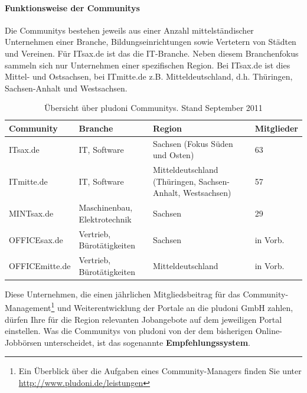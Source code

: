 \paragraph{Funktionsweise der Communitys}
Die Communitys bestehen jeweils aus einer Anzahl mittelständischer Unternehmen einer Branche, Bildungseinrichtungen sowie Vertetern von Städten und Vereinen. Für ITsax.de ist das die IT-Branche. Neben diesem Branchenfokus sammeln sich nur Unternehmen einer spezifischen Region. Bei ITsax.de ist dies Mittel- und Ostsachsen, bei ITmitte.de z.B. Mitteldeutschland, d.h. Thüringen, Sachsen-Anhalt und Westsachsen.
\begin{table}[htbp]
\label{tb:dt}
\caption{Übersicht über pludoni Communitys. Stand September 2011}
\begin{tabular}{|l|p{3.8cm}|p{5cm}|l|}
\hline
\rowcolor{Gray}
Community & Branche & Region & Mitglieder \\\hline
ITsax.de & IT, Software &  Sachsen (Fokus Süden und Osten) & 63\\\hline
ITmitte.de & IT, Software &  Mitteldeutschland (Thüringen, Sachsen-Anhalt, Westsachsen) & 57 \\\hline
MINTsax.de & Maschinenbau, Elektrotechnik &  Sachsen & 29\\\hline
OFFICEsax.de & Vertrieb, Bürotätigkeiten &  Sachsen & in Vorb.\\\hline
OFFICEmitte.de & Vertrieb, Bürotätigkeiten &  Mitteldeutschland & in Vorb.\\\hline
\end{tabular}
\end{table}



Diese Unternehmen, die einen jährlichen Mitgliedsbeitrag für das Community\hyp{}Management\footnote{Ein Überblick über die Aufgaben eines Community-Managers finden Sie unter \url{http://www.pludoni.de/leistungen}} und Weiterentwicklung der Portale an die pludoni GmbH zahlen, dürfen Ihre für die Region relevanten Jobangebote auf dem jeweiligen Portal einstellen. Was die Communitys von pludoni von der dem bisherigen Online-Jobbörsen unterscheidet, ist das sogenannte \textbf{Empfehlungssystem}.

